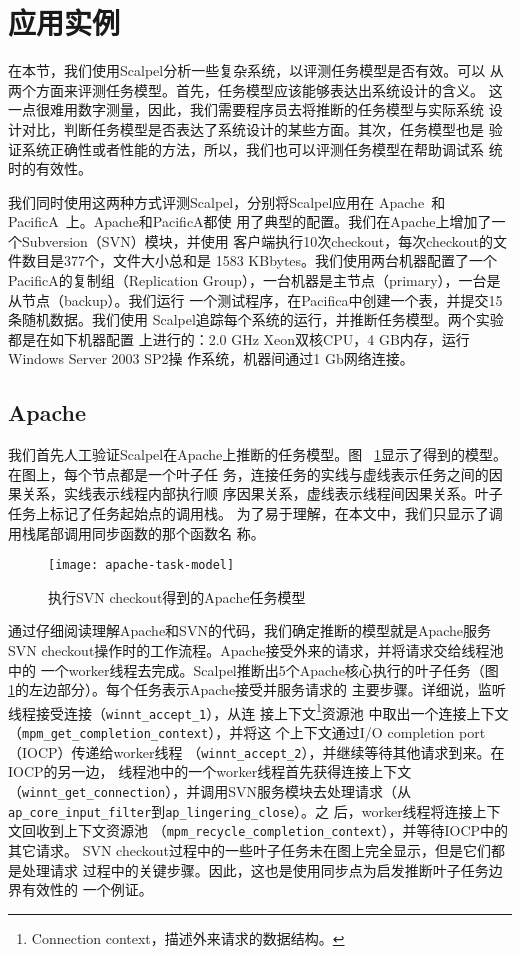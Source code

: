 \section{应用实例}
\label{sec:scp:case}

在本节，我们使用Scalpel分析一些复杂系统，以评测任务模型是否有效。可以
从两个方面来评测任务模型。首先，任务模型应该能够表达出系统设计的含义。
这一点很难用数字测量，因此，我们需要程序员去将推断的任务模型与实际系统
设计对比，判断任务模型是否表达了系统设计的某些方面。其次，任务模型也是
验证系统正确性或者性能的方法，所以，我们也可以评测任务模型在帮助调试系
统时的有效性。

我们同时使用这两种方式评测Scalpel，分别将Scalpel应用在
Apache~\cite{apache}和PacificA~\cite{pacifica}上。Apache和PacificA都使
用了典型的配置。我们在Apache上增加了一个Subversion（SVN）模块，并使用
客户端执行10次checkout，每次checkout的文件数目是377个，文件大小总和是
1583 KBbytes。我们使用两台机器配置了一个PacificA的复制组（Replication
Group），一台机器是主节点（primary），一台是从节点（backup）。我们运行
一个测试程序，在Pacifica中创建一个表，并提交15条随机数据。我们使用
Scalpel追踪每个系统的运行，并推断任务模型。两个实验都是在如下机器配置
上进行的：2.0 GHz Xeon双核CPU，4 GB内存，运行Windows Server 2003 SP2操
作系统，机器间通过1 Gb网络连接。

\subsection{Apache}

我们首先人工验证Scalpel在Apache上推断的任务模型。图~
\ref{fig:apache_model}显示了得到的模型。在图上，每个节点都是一个叶子任
务，连接任务的实线与虚线表示任务之间的因果关系，实线表示线程内部执行顺
序因果关系，虚线表示线程间因果关系。叶子任务上标记了任务起始点的调用栈。
为了易于理解，在本文中，我们只显示了调用栈尾部调用同步函数的那个函数名
称。

\begin{figure}
\centering
\texttt{[image: apache-task-model]}
\caption{执行SVN checkout得到的Apache任务模型}
\label{fig:apache_model}
\end{figure}


通过仔细阅读理解Apache和SVN的代码，我们确定推断的模型就是Apache服务SVN
checkout操作时的工作流程。Apache接受外来的请求，并将请求交给线程池中的
一个worker线程去完成。Scalpel推断出5个Apache核心执行的叶子任务（图~
\ref{fig:apache_model}的左边部分）。每个任务表示Apache接受并服务请求的
主要步骤。详细说，监听线程接受连接（\texttt{winnt\_accept\_1}），从连
接上下文\footnote{Connection context，描述外来请求的数据结构。}资源池
中取出一个连接上下文（\texttt{mpm\_get\_completion\_context}），并将这
个上下文通过I/O completion port（IOCP）传递给worker线程
（\texttt{winnt\_accept\_2}），并继续等待其他请求到来。在IOCP的另一边，
线程池中的一个worker线程首先获得连接上下文
（\texttt{winnt\_get\_connection}），并调用SVN服务模块去处理请求（从
\texttt{ap\_core\_input\_filter}到\texttt{ap\_lingering\_close}）。之
后，worker线程将连接上下文回收到上下文资源池
（\texttt{mpm\_recycle\_completion\_context}），并等待IOCP中的其它请求。
SVN checkout过程中的一些叶子任务未在图上完全显示，但是它们都是处理请求
过程中的关键步骤。因此，这也是使用同步点为启发推断叶子任务边界有效性的
一个例证。

